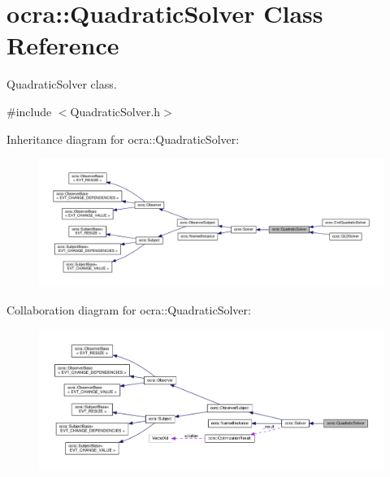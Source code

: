 \hypertarget{classocra_1_1QuadraticSolver}{}\section{ocra\+:\+:Quadratic\+Solver Class Reference}
\label{classocra_1_1QuadraticSolver}


Quadratic\+Solver class.  




{\ttfamily \#include $<$Quadratic\+Solver.\+h$>$}



Inheritance diagram for ocra\+:\+:Quadratic\+Solver\+:
\nopagebreak
\begin{figure}[H]
\begin{center}
\leavevmode
\includegraphics[width=350pt]{dd/ddf/classocra_1_1QuadraticSolver__inherit__graph}
\end{center}
\end{figure}


Collaboration diagram for ocra\+:\+:Quadratic\+Solver\+:
\nopagebreak
\begin{figure}[H]
\begin{center}
\leavevmode
\includegraphics[width=350pt]{dd/dc5/classocra_1_1QuadraticSolver__coll__graph}
\end{center}
\end{figure}
